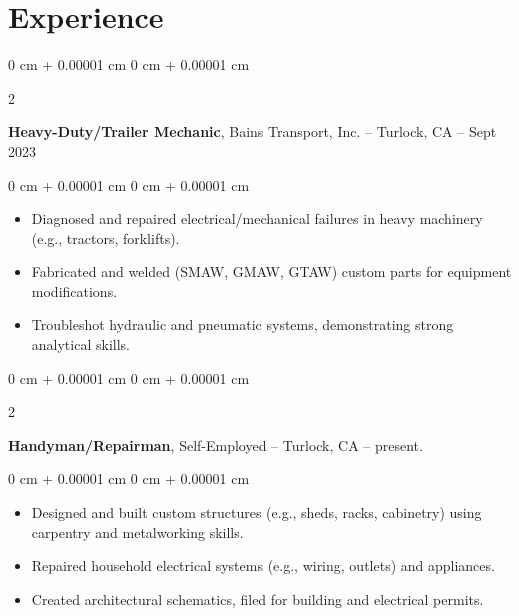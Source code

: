 \documentclass[10pt, letterpaper]{article}
\newenvironment{highlights}{
    \begin{itemize}[
        topsep=0.10 cm,
        parsep=0.10 cm,
        partopsep=0pt,
        itemsep=0pt,
        leftmargin=0 cm + 10pt
    ]
}{
    \end{itemize}
} %
\newenvironment{onecolentry}{
    \begin{adjustwidth}{
        0 cm + 0.00001 cm
    }{
        0 cm + 0.00001 cm
    }
}{
    \end{adjustwidth}
} %
\newenvironment{twocolentry}[2][]{
    \onecolentry
    \def\secondColumn{#2}
    \setcolumnwidth{\fill, 4.5 cm}
    \begin{paracol}{2}
}{
    \switchcolumn \raggedleft \secondColumn
    \end{paracol}
    \endonecolentry
} %
\begin{document}
    \section{Experience}

        \begin{twocolentry}{
            2016 – Sept 2023
        }
            \textbf{Heavy-Duty/Trailer Mechanic}, Bains Transport, Inc. -- Turlock, CA \end{twocolentry}

        \vspace{0.10 cm}
        \begin{onecolentry}
            \begin{highlights}
                \item Diagnosed and repaired electrical/mechanical failures in heavy machinery (e.g., tractors, forklifts).
                \item Fabricated and welded (SMAW, GMAW, GTAW) custom parts for equipment modifications.
                \item Troubleshot hydraulic and pneumatic systems, demonstrating strong analytical skills.
            \end{highlights}
        \end{onecolentry}

        \vspace{0.2 cm}

        \begin{twocolentry}{
            2018 – present.
        }
            \textbf{Handyman/Repairman}, Self-Employed -- Turlock, CA \end{twocolentry}

        \vspace{0.10 cm}
        \begin{onecolentry}
            \begin{highlights}
                \item Designed and built custom structures (e.g., sheds, racks, cabinetry) using carpentry and metalworking skills.
                \item Repaired household electrical systems (e.g., wiring, outlets) and appliances.
                \item Created architectural schematics, filed for building and electrical permits. 
            \end{highlights}
        \end{onecolentry}

        \vspace{0.2 cm}
\end{document}
